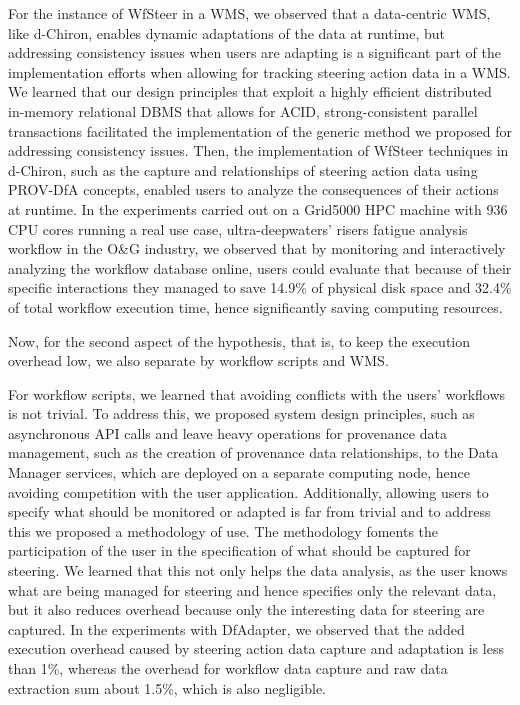 For the instance of WfSteer in a WMS, we observed that a data-centric WMS, like d-Chiron, enables dynamic
adaptations of the data at runtime, but addressing consistency issues when users are adapting is a significant part of the implementation efforts when allowing for tracking steering action data in a WMS.
We learned that our design principles that exploit a highly efficient
distributed in-memory relational DBMS that allows for  ACID, strong-consistent parallel
transactions facilitated the implementation of the generic method we proposed
for addressing consistency issues.
Then, the implementation of WfSteer techniques in d-Chiron,
such as the capture and relationships of steering action data using
PROV-DfA concepts, enabled users to analyze the consequences of their actions
at runtime.
In the experiments carried out on
a Grid5000 HPC machine with 936 CPU cores running a real use case, ultra-deepwaters' risers fatigue analysis workflow in the O\&G industry,
we observed that
by monitoring and interactively analyzing the workflow database online,
users could evaluate that because of their specific interactions
they managed to save 14.9\% of physical disk space and 32.4\% of total workflow execution time, hence significantly saving computing resources.

Now, for the second aspect of the hypothesis, that is, to keep the execution overhead low, we also separate by workflow scripts and WMS.

For workflow scripts, 
we learned that avoiding conflicts with the users' workflows is not trivial.
To address this, we proposed system design principles, such as
asynchronous API calls and leave heavy operations for provenance data management, such as the creation of provenance data relationships, to the Data Manager services, which are deployed on a separate computing node, hence avoiding competition with the user application.
Additionally, allowing users to specify what should be
monitored or adapted is far from trivial and to address this we proposed a methodology of use.
The methodology foments the participation of the user in the specification of
what should be captured for steering.
We learned that this not only helps the data analysis, as the user knows what are being managed for steering and hence
specifies only the relevant data, but it also reduces overhead because only the
interesting data for steering are captured.
In the experiments with DfAdapter, we observed that the added execution overhead caused by
steering action data capture and adaptation is less than 1\%, whereas the overhead for workflow data capture and raw data extraction sum about 1.5\%, which is also negligible.

